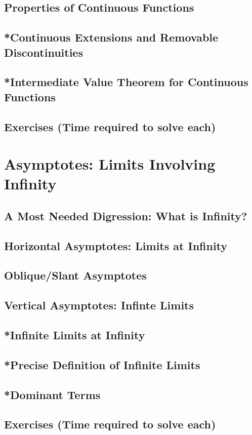\documentclass[11pt,letterpaper,twoside]{book}
\begin{document}
\subsection{Properties of Continuous Functions}
\subsection{*Continuous Extensions and Removable Discontinuities}
\subsection{*Intermediate Value Theorem for Continuous Functions}
\subsection{Exercises (Time required to solve each)}

\newpage
\section{Asymptotes: Limits Involving Infinity}
\subsection{A Most Needed Digression: What is Infinity?}
\subsection{Horizontal Asymptotes: Limits at Infinity}
\subsection{Oblique/Slant Asymptotes}
\subsection{Vertical Asymptotes: Infinte Limits}
\subsection{*Infinite Limits at Infinity}
\subsection{*Precise Definition of Infinite Limits}
\subsection{*Dominant Terms}
\subsection{Exercises (Time required to solve each)}
\end{document}
